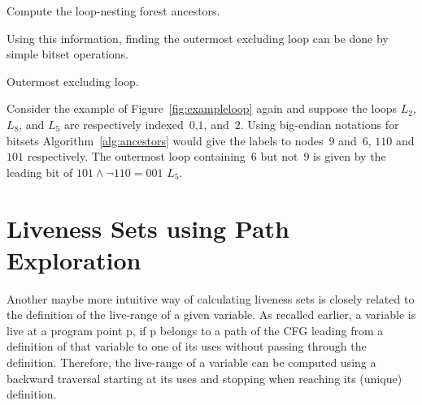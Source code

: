\begin{algorithm}
\caption{Compute the loop-nesting forest ancestors.}
\label{alg:ancestors}
\end{algorithm}

Using this information, finding the outermost excluding loop can be done by simple bitset operations.

\begin{algorithm}
\caption{Outermost excluding loop.}
\label{alg:hnca}
\end{algorithm}

\begin{example}
	Consider the example of Figure~\ref{fig:exampleloop} again and suppose the loops $L_2$, $L_8$, and $L_5$ are respectively indexed~$0$,$1$, and~$2$.
	Using big-endian notations for bitsets Algorithm~\ref{alg:ancestors} would give the labels to nodes~$9$ and~$6$, $110$ and $101$ respectively.
	The outermost loop containing~$6$ but not~$9$ is given by the leading bit of $101\wedge \lnot 110=001$ \ie $L_5$.
\end{example}


\section{Liveness Sets using Path Exploration}
\label{sec:path-explore}

Another maybe more intuitive way of calculating liveness sets is closely related to the definition of the live-range of a given variable.
As recalled earlier, a variable is live at a program point p, if p belongs to a path of the CFG leading from a definition of that variable to one of its uses without passing through the definition.
Therefore, the live-range of a variable can be computed using a backward traversal starting at its uses and stopping when reaching its (unique) definition.

